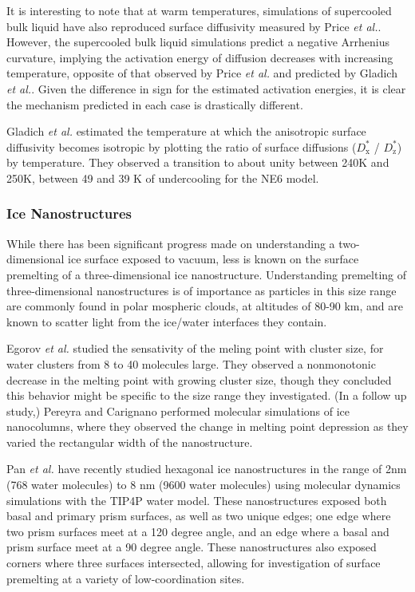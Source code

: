 It is interesting to note that at warm temperatures, simulations of
supercooled bulk liquid\cite{Picaud2006,Mahoney2001} have also reproduced surface
diffusivity measured by Price \textit{et al.}. However, the
supercooled bulk liquid simulations predict a negative Arrhenius
curvature, implying the activation energy of diffusion decreases with
increasing temperature, opposite of that observed by Price \textit{et
  al.} and predicted by Gladich \textit{et al.}. Given the difference
in sign for the estimated activation energies, it is clear the
mechanism predicted in each case is drastically different. 

Gladich \textit{et al.} estimated the temperature at which the
anisotropic surface diffusivity becomes isotropic by plotting the
ratio of surface diffusions ($D^{*}_\mathrm{x}$ / $D^{*}_\mathrm{z}$)
by temperature. They observed a transition to about unity between 240K
and 250K, between 49 and 39 K of undercooling for the NE6 model.


\subsubsection{Ice Nanostructures}
While there has been significant progress made on understanding a
two-dimensional ice surface exposed to vacuum, less is known on the
surface premelting of a three-dimensional ice
nanostructure. Understanding premelting of three-dimensional
nanostructures is of importance as particles in this size range are
commonly found in polar mospheric clouds, at altitudes of 80-90 km,
and are known to scatter light from the ice/water interfaces they
contain.\cite{Murray2010} 

Egorov \textit{et al.} studied the sensativity of the meling point
with cluster size, for water clusters from 8 to 40 molecules
large.\cite{Egorov2002} They observed a nonmonotonic decrease in the melting
point with growing cluster size, though they concluded this behavior
might be specific to the size range they investigated. (In a follow up
study,) Pereyra and Carignano performed molecular simulations of ice
nanocolumns, where they observed the change in melting point
depression as they varied the rectangular width of the
nanostructure.\cite{Pereyra2009} 

Pan \textit{et al.} have recently studied hexagonal ice nanostructures
in the range of 2nm (768 water molecules) to 8 nm (9600 water
molecules) using molecular dynamics simulations with the TIP4P water
model.\cite{Pan2011} These nanostructures exposed both basal and primary
prism surfaces, as well as two unique edges; one edge where two prism
surfaces meet at a 120 degree angle, and an edge where a basal and
prism surface meet at a 90 degree angle. These nanostructures also
exposed corners where three surfaces intersected, allowing for
investigation of surface premelting at a variety of low-coordination
sites.

